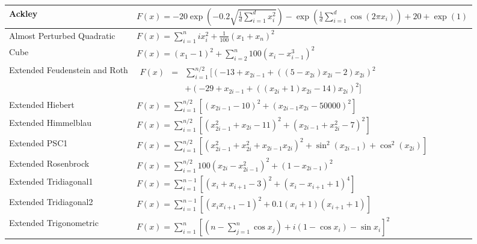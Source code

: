 \begin{table}[H]
	\vspace{-20mm}
	\hspace{-27mm}
	\renewcommand{\arraystretch}{1.5}
	\begin{tabular}{|l|l|}
		\hline
		Ackley & $F(x)=-20 \exp \left(-0.2 \sqrt{\frac{1}{d} \sum_{i=1}^{d} x_{i}^{2}}\right)-\exp \left(\frac{1}{d} \sum_{i=1}^{d} \cos \left(2\pi x_{i}\right)\right)+20+\exp (1) $\\ \hline
		Almost Perturbed Quadratic & $F(x)=\sum_{i=1}^{n} i x_{i}^{2}+\frac{1}{100}\left(x_{1}+x_{n}\right)^{2}$\\ \hline
		Cube & $F(x)=\left(x_{1}-1\right)^{2}+\sum_{i=2}^{n} 100\left(x_{i}-x_{i-1}^{3}\right)^{2}$\\ \hline
		Extended Feudenstein and Roth & $\begin{array} {lcl} F(x) & = & \sum_{i=1}^{n / 2}\big[ \left(-13+x_{2 i-1}+\left(\left(5-x_{2 i}\right) x_{2 i}-2\right) x_{2 i}\right)^{2} \\ &  &+ \left(-29+x_{2 i-1}+\left(\left(x_{2 i}+1\right) x_{2 i}-14\right) x_{2 i}\right)^{2} \big] \end{array}$ \\ \hline
		Extended Hiebert & $F(x)=\sum_{i=1}^{n / 2}\left[\left(x_{2 i-1}-10\right)^{2}+\left(x_{2 i-1} x_{2 i}-50000\right)^{2}\right]$\\ \hline
		Extended Himmelblau & $F(x)=\sum_{i=1}^{n / 2}\left[\left(x_{2 i-1}^{2}+x_{2 i}-11\right)^{2}+\left(x_{2 i-1}+x_{2 i}^{2}-7\right)^{2}\right]$\\ \hline
		Extended PSC1 & $F(x)=\sum_{i=1}^{n / 2}\left[\left(x_{2 i-1}^{2}+x_{2 i}^{2}+x_{2 i-1} x_{2 i}\right)^{2}+\sin ^{2}\left(x_{2 i-1}\right)+\cos ^{2}\left(x_{2 i}\right)\right]$\\ \hline
		Extended Rosenbrock & $F(x)=\sum_{i=1}^{n / 2} 100\left(x_{2 i}-x_{2 i-1}^{2}\right)^{2}+\left(1-x_{2 i-1}\right)^{2}$\\ \hline
		Extended Tridiagonal1 & $F(x)=\sum_{i=1}^{n-1}\left[\left(x_{i}+x_{i+1}-3\right)^{2}+\left(x_{i}-x_{i+1}+1\right)^{4}\right]$\\ \hline
		Extended Tridiagonal2 & $F(x)=\sum_{i=1}^{n-1}\left[\left(x_{i} x_{i+1}-1\right)^{2}+0.1\left(x_{i}+1\right)\left(x_{i+1}+1\right)\right]$\\ \hline
		Extended Trigonometric & $F(x)=\sum_{i=1}^{n}\left[\left(n-\sum_{j=1}^{n} \cos x_{j}\right)+i\left(1-\cos x_{i}\right)-\sin x_{i}\right]^{2}$ \\ \hline

\end{tabular}
\end{table}
